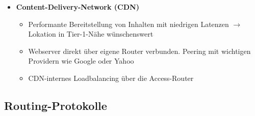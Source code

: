 \begin{itemize}
	\item \textbf{Content-Delivery-Network (CDN)}
	\begin{itemize}
		\item Performante Bereitstellung von Inhalten mit niedrigen Latenzen \(\rightarrow\) Lokation in Tier-1-Nähe wünschenswert
		\item Webserver direkt über eigene Router verbunden. Peering mit wichtigen Providern wie Google oder Yahoo
		\item CDN-internes Loadbalancing über die Access-Router
	\end{itemize}
\end{itemize}


\subsection{Routing-Protokolle}

